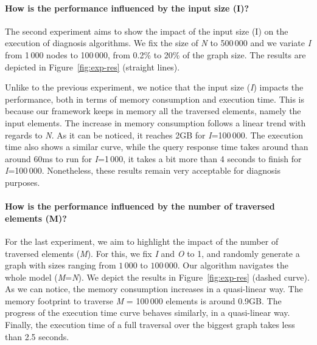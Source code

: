 \paragraph{How is the performance influenced by the input size (I)?}
The second experiment aims to show the impact of the input size (I) on the execution of diagnosis algorithms. We fix the size of \textit{N} to 500\,000 and we variate \textit{I} from 1\,000 nodes to 100\,000, \ie from 0.2\% to 20\% of the graph size. 
The results are depicted in Figure~\ref{fig:exp-res} (straight lines).

Unlike to the previous experiment, we notice that the input size (\textit{I}) impacts the performance, both in terms of memory consumption and execution time. This is because our framework keeps in memory all the traversed elements, namely the input elements.
The increase in memory consumption follows a linear trend with regards to \textit{N}. As it can be noticed, it reaches 2GB for \textit{I}=100\,000. The execution time also shows a similar curve, while the query response time takes around than around 60ms to run for \textit{I}=1\,000, it takes a bit more than 4 seconds to finish for \textit{I}=100\,000. Nonetheless, these results remain very acceptable for diagnosis purposes. 

\paragraph{How is the performance influenced by the number of traversed elements (M)?}%
For the last experiment, we aim to highlight the impact of the number of traversed elements (\textit{M}). For this, we fix \textit{I} and \textit{O} to 1, and randomly generate a graph with sizes ranging from $1\,000$ to $100\,000$. Our algorithm navigates the whole model (\textit{M}=\textit{N}).
We depict the results in Figure~\ref{fig:exp-res} (dashed curve).
As we can notice, the memory consumption increases in a quasi-linear way. The memory footprint to traverse \textit{M} = 100\,000 elements is around 0.9GB. The progress of the execution time curve behaves similarly, in a quasi-linear way. Finally, the execution time of a full traversal over the biggest graph takes less than 2.5 seconds. 

